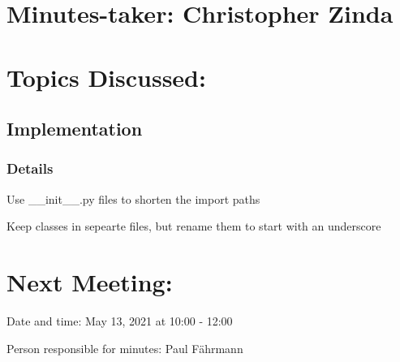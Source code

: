 \documentclass[11pt]{meetingmins} %
\begin{document}
\maketitle

\section{Minutes-taker: Christopher Zinda}

\section{Topics Discussed:}

\subsection{Implementation}
\subsubsection{Details}
\begin{hiddensubitems}
	\item Use \_\_init\_\_.py files to shorten the import paths
	\item Keep classes in sepearte files, but rename them to start with an underscore
\end{hiddensubitems}

\section{Next Meeting:}
\begin{hiddensubitems}
	\item Date and time: May 13, 2021 at 10:00 - 12:00
	\item Person responsible for minutes: Paul Fährmann
\end{hiddensubitems}
\end{document}
